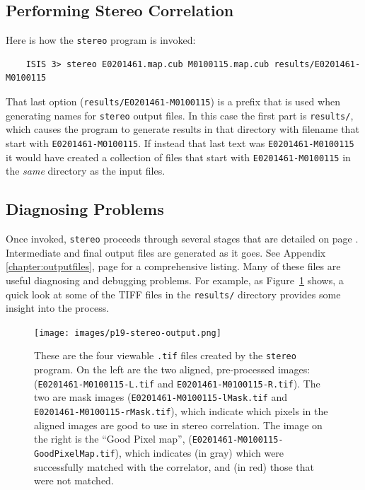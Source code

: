 \subsection{Performing Stereo Correlation}

Here is how the \texttt{stereo} program is invoked:

\begin{verbatim}
    ISIS 3> stereo E0201461.map.cub M0100115.map.cub results/E0201461-M0100115
\end{verbatim}

\noindent
That last option (\texttt{results/E0201461-M0100115}) is a prefix that
is used when generating names for \texttt{stereo} output files.  In
this case the first part is \texttt{results/}, which causes the
program to generate results in that directory with filename that start
with \texttt{E0201461-M0100115}. If instead that last text was
\texttt{E0201461-M0100115} it would have created a collection of files
that start with \texttt{E0201461-M0100115} in the {\em same} directory as
the input files.

\subsection{Diagnosing Problems}

Once invoked, \texttt{stereo} proceeds through several stages that are
detailed on page \pageref{entrypoints}.  Intermediate and final output
files are generated as it goes.  See Appendix
\ref{chapter:outputfiles}, page \pageref{chapter:outputfiles} for a
comprehensive listing.  Many of these files are useful diagnosing and
debugging problems.  For example, as Figure~\ref{p19-stereo-output}
shows, a quick look at some of the TIFF files in the \texttt{results/}
directory provides some insight into the process.

\begin{figure}
\begin{center}
\texttt{[image: images/p19-stereo-output.png]}
\caption[P19 stereo output images]{
    \label{p19-stereo-output}
	These are the four viewable \texttt{.tif} files created by the
        \texttt{stereo} program.  On the left are the two aligned,
        pre-processed images: (\texttt{E0201461-M0100115-L.tif} and
        \texttt{E0201461-M0100115-R.tif}).  The two are mask images
        (\texttt{E0201461-M0100115-lMask.tif} and
        \texttt{E0201461-M0100115-rMask.tif}), which indicate which
        pixels in the aligned images are good to use in stereo
        correlation.  The image on the right is the ``Good Pixel
        map'', (\texttt{E0201461-M0100115-GoodPixelMap.tif}), which
        indicates (in gray) which were successfully matched with the
        correlator, and (in red) those that were not matched.}
\end{center}
\end{figure}

